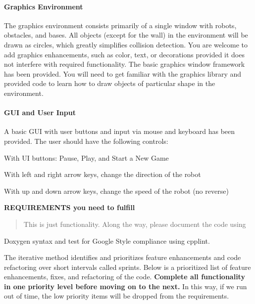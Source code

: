 \paragraph*{Graphics Environment}

The graphics environment consists primarily of a single window with robots, obstacles, and bases. All objects (except for the wall) in the environment will be drawn as circles, which greatly simplifies collision detection. You are welcome to add graphics enhancements, such as color, text, or decorations provided it does not interfere with required functionality. The basic graphics window framework has been provided. You will need to get familiar with the graphics library and provided code to learn how to draw objects of particular shape in the environment.

\paragraph*{G\+UI and User Input}

A basic G\+UI with user buttons and input via mouse and keyboard has been provided. The user should have the following controls\+:


\begin{DoxyItemize}
\item With UI buttons\+: Pause, Play, and Start a New Game
\item With left and right arrow keys, change the direction of the robot
\item With up and down arrow keys, change the speed of the robot (no reverse)
\end{DoxyItemize}





{\bfseries R\+E\+Q\+U\+I\+R\+E\+M\+E\+N\+TS you need to fulfill}

\begin{quote}
This is just functionality. Along the way, please document the code using \end{quote}
Doxygen syntax and test for Google Style compliance using cpplint.

The iterative method identifies and prioritizes feature enhancements and code refactoring over short intervals called sprints. Below is a prioritized list of feature enhancements, fixes, and refactoring of the code. {\bfseries Complete all functionality in one priority level before moving on to the next.} In this way, if we run out of time, the low priority items will be dropped from the requirements.

